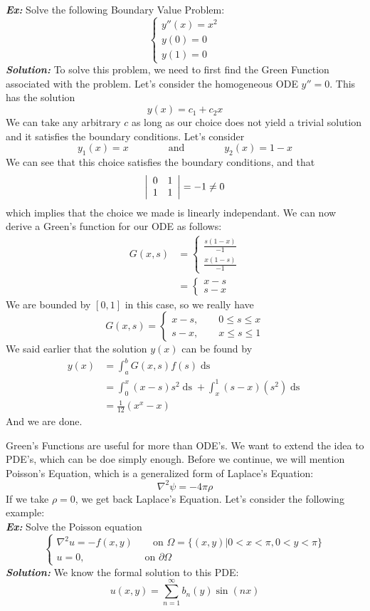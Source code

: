\noindent\textbf{\textit{Ex:}} Solve the following Boundary Value Problem:
\[
\begin{cases*}
y''(x) = x^{2}\\
y(0) = 0\\
y(1) = 0
\end{cases*}
\]
\indent\textbf{\textit{Solution:}} To solve this problem, we need to first find the Green Function
associated with the problem. Let's consider the homogeneous ODE $y'' = 0$. This has the solution
\[
y(x) = c_{1} + c_{2}x
\]
We can take any arbitrary $c$ as long as our choice does not yield a trivial solution and it satisfies
the boundary conditions. Let's consider
\[
y_{1}(x) = x\qquad\qquad\text{and}\qquad\qquad y_{2}(x) = 1 - x
\]
We can see that this choice satisfies the boundary conditions, and that
\[
\left|
\begin{array}{c c}
0 & 1\\
1 & 1
\end{array}\right|
= -1 \neq 0
\]
which implies that the choice we made is linearly independant. We can now derive a Green's function
for our ODE as follows:
\begin{align*}
G(x,s) &=
\begin{cases*}
\frac{s(1-x)}{-1}\\
\frac{x(1-s)}{-1}
\end{cases*}\\
&=
\begin{cases*}
x-s\\
s-x
\end{cases*}
\end{align*}
We are bounded by $[0,1]$ in this case, so we really have
\[
G(x,s) =
\begin{cases*}
x-s,\qquad 0\leq s\leq x\\
s-x,\qquad x\leq s\leq 1
\end{cases*}
\]
We said earlier that the solution $y(x)$ can be found by
\begin{align*}
y(x) &= \int_{a}^{b}G(x,s)f(s)\mathop{ds}\\
&= \int_{0}^{x}(x-s)s^{2}\mathop{ds} + \int_{x}^{1}(s-x)(s^{2})\mathop{ds}\\
&= \frac{1}{12}(x^{x} - x)
\end{align*}
And we are done.
\newpage

Green's Functions are useful for more than ODE's. We want to extend the idea to PDE's, which can
be doe simply enough. Before we continue, we will mention Poisson's Equation, which is a
generalized form of Laplace's Equation:
\[
\nabla^{2}\psi = -4\pi\rho
\]
If we take $\rho = 0$, we get back Laplace's Equation. Let's consider the following example:\\


\noindent\textbf{\textit{Ex:}} Solve the Poisson equation
\[
\begin{cases*}
\nabla^{2}u = -f(x,y)\qquad \text{on }\Omega = \{(x,y)|0<x<\pi,0<y<\pi\}\\
u = 0,\qquad\qquad\qquad\text{on } \partial\Omega
\end{cases*}
\]
\indent\textbf{\textit{Solution:}} We know the formal solution to this PDE:
\[
u(x,y) = \sum_{n=1}^{\infty}b_{n}(y)\sin{(nx)}
\]
